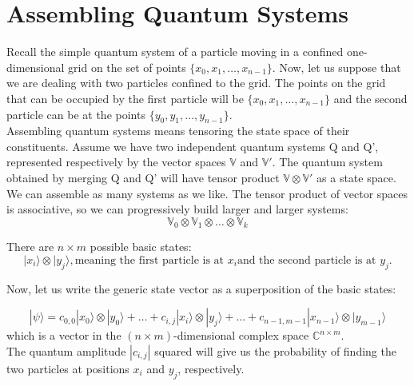 \documentclass{article}
\begin{document}
\section{Assembling Quantum Systems}

Recall the simple quantum system of a particle moving in a confined one-dimensional grid on the set of points $\{x_0, x_1, \dots, x_{n-1}\}$. Now, let us suppose that we are dealing with two particles confined to the grid. The points on the grid that can be occupied by the first particle will be $\{x_0, x_1, \dots, x_{n-1}\}$ and the second particle can be at the points $\{y_0, y_1, \dots, y_{n-1}\}$.\\

Assembling quantum systems means tensoring the state space of their constituents. Assume we have two independent quantum systems Q and Q', represented respectively by the vector spaces $\mathbb{V}$ and $\mathbb{V'}$. The quantum system obtained by merging Q and Q' will have tensor product $\mathbb{V} \otimes \mathbb{V'}$ as a state space.\\

We can assemble as many systems as we like. The tensor product of vector spaces is associative, so we can progressively build larger and larger systems:
\begin{equation}
    \mathbb{V}_0 \otimes \mathbb{V}_1 \otimes \ldots \otimes \mathbb{V}_k
\end{equation}

There are $n \times m$ possible basic states:
\begin{equation*}
    |x_i\rangle \otimes |y_j\rangle, \text{meaning the first particle is at } x_i \text {and the second particle is at } y_j.
\end{equation*}

Now, let us write the generic state vector as a superposition of the basic states:

\begin{equation}
    |\psi\rangle = c_{0,0}|x_0\rangle\otimes|y_0\rangle + \ldots + c_{i,j}|x_i\rangle\otimes|y_j\rangle + \ldots + c_{n-1,m-1}|x_{n-1}\rangle\otimes|y_{m-1}\rangle
\end{equation}
which is a vector in the $(n \times m)$-dimensional complex space $\mathbb{C}^{n \times m}$.\\

The quantum amplitude $|c_{i,j}|$ squared will give us the probability of finding the two particles at positions $x_i$ and $y_j$, respectively.
\end{document}
